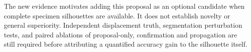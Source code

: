 The new evidence motivates adding this proposal as an optional candidate
when complete specimen silhouettes are available. It does not establish
novelty or general superiority. Independent displacement truth, segmentation
perturbation tests, and paired ablations of proposal-only, confirmation and
propagation are still required before attributing a quantified accuracy gain
to the silhouette itself.
